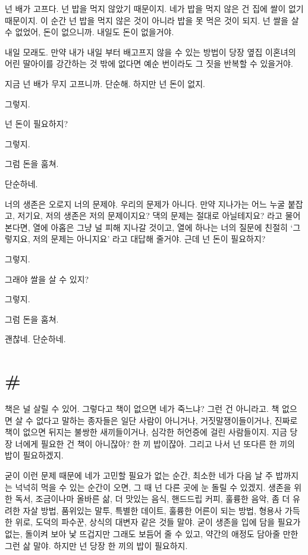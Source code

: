 \documentclass[a5paper,10pt, twoside, openright]{memoir}
\begin{document}
	넌 배가 고프다. 넌 밥을 먹지 않았기 때문이지. 네가 밥을 먹지 않은 건 집에 쌀이 없기 때문이지. 이 순간 넌 밥을 먹지 않은 것이 아니라 밥을 못 먹은 것이 되지. 넌 쌀을 살 수 없었어, 돈이 없으니까. 내일도 돈이 없을거야. 

	내일 모래도. 만약 내가 내일 부터 배고프지 않을 수 있는 방법이 당장 옆집 이혼녀의 어린 딸아이를 강간하는 것 밖에 없다면 예순 번이라도 그 짓을 반복할 수 있을거야. 

	지금 넌 배가 무지 고프니까. 단순해. 하지만 넌 돈이 없지. 

	그렇지. 

	넌 돈이 필요하지? 

	그렇지. 

	그럼 돈을 훔쳐. 

	단순하네. 

	너의 생존은 오로지 너의 문제야. 우리의 문제가 아니다. 만약 지나가는 어느 누굴 붙잡고, 저기요, 저의 생존은 저의 문제이지요? 댁의 문제는 절대로 아닐테지요? 라고 물어본다면, 열에 아홉은 그냥 널 피해 지나갈 것이고, 열에 하나는 너의 질문에 친절히 ‘그렇지요, 저의 문제는 아니지요’ 라고 대답해 줄거야. 근데 넌 돈이 필요하지? 

	그렇지. 

	그래야 쌀을 살 수 있지? 

	그렇지. 

	그럼 돈을 훔쳐. 

	괜찮네. 단순하네. 

	\section{\#}
	책은 널 살릴 수 있어. 그렇다고 책이 없으면 네가 죽느냐? 그런 건 아니라고. 책 없으면 살 수 없다고 말하는 종자들은 일단 사람이 아니거나, 거짓말쟁이들이거나, 진짜로 책이 없으면 뒤지는 불쌍한 새끼들이거나, 심각한 허언증에 걸린 사람들이지. 지금 당장 너에게 필요한 건 책이 아니잖아? 한 끼 밥이잖아. 그리고 나서 넌 또다른 한 끼의 밥이 필요하겠지. 
	
	굳이 이런 문제 때문에 네가 고민할 필요가 없는 순간, 최소한 네가 다음 날 주 밥까지는 넉넉히 먹을 수 있는 순간이 오면, 그 때 넌 다른 곳에 눈 돌릴 수 있겠지. 생존을 위한 독서, 조금이나마 올바른 삶, 더 맛있는 음식, 핸드드립 커피, 훌륭한 음악, 좀 더 유려한 자살 방법, 품위있는 말투, 특별한 데이트, 훌륭한 어른이 되는 방법, 형용사 가득한 위로, 도덕의 파수꾼, 상식의 대변자 같은 것들 말야. 굳이 생존을 입에 담을 필요가 없는, 돌이켜 보아 낯 뜨겁지만 그래도 보듬어 줄 수 있고, 약간의 애정도 담아줄 만한 그런 삶 말야. 하지만 넌 당장 한 끼의 밥이 필요하지. 
\end{document}
